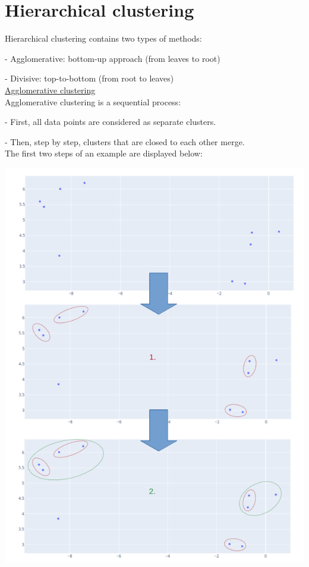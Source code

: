 \section*{Hierarchical clustering}

Hierarchical clustering contains two types of methods:

- Agglomerative: bottom-up approach (from leaves to root)

- Divisive: top-to-bottom (from root to leaves)\\

\underline{Agglomerative clustering} \\

Agglomerative clustering is a sequential process:

- First, all data points are considered as separate clusters.

- Then, step by step, clusters that are closed to each other merge. \\

The first two steps of an example are displayed below:

\begin{center}
\includegraphics[scale=0.4]{hierarchical_clustering_steps.png}
\end{center}

